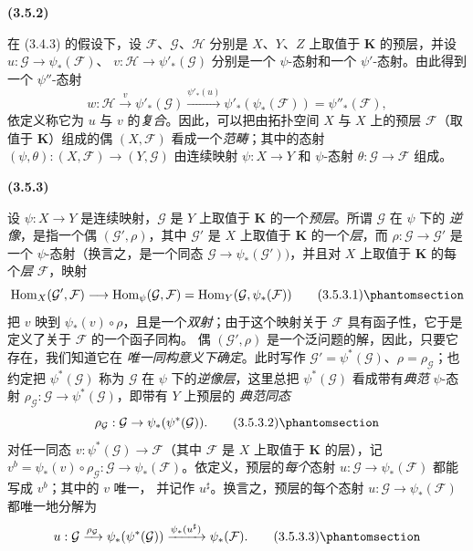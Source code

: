 \documentclass[UTF8,fontset=none,11pt,oneside,openany]{ctexbook}
\newenvironment{env}[1][]{%
  \par\medskip\noindent\textbf{(#1)}\ %
}{\par}
\let\EGAOriginalLabel\label
\renewcommand{\label}[1]{\phantomsection\EGAOriginalLabel{#1}}
\begin{document}
\begin{env}[3.5.2]
\label{0.3.5.2-fr}
在 (3.4.3) 的假设下，设 $\mathcal{F}$、$\mathcal{G}$、$\mathcal{H}$
分别是 $X$、$Y$、$Z$ 上取值于 $\mathbf{K}$ 的预层，并设
$u:\mathcal{G}\to\psi_*(\mathcal{F})$、
$v:\mathcal{H}\to\psi'_*(\mathcal{G})$ 分别是一个 $\psi$-态射和一个
$\psi'$-态射。由此得到一个 $\psi''$-态射
\[
  w:\mathcal{H}\xrightarrow{v}\psi'_*(\mathcal{G})
  \xrightarrow{\psi'_*(u)}
  \psi'_*(\psi_*(\mathcal{F}))=\psi''_*(\mathcal{F}),
\]
依定义称它为 $u$ 与 $v$ 的\emph{复合}。因此，可以把由拓扑空间 $X$ 与
$X$ 上的预层 $\mathcal{F}$（取值于 $\mathbf{K}$）组成的偶
$(X,\mathcal{F})$ 看成一个\emph{范畴}；其中的态射
$(\psi,\theta):(X,\mathcal{F})\to(Y,\mathcal{G})$ 由连续映射
$\psi:X\to Y$ 和 $\psi$-态射 $\theta:\mathcal{G}\to\mathcal{F}$ 组成。
\end{env}

\begin{env}[3.5.3]
\label{0.3.5.3-fr}
设 $\psi:X\to Y$ 是连续映射，$\mathcal{G}$ 是 $Y$ 上取值于
$\mathbf{K}$ 的一个\emph{预层}。所谓 $\mathcal{G}$ 在 $\psi$ 下的
\emph{逆像}，是指一个偶 $(\mathcal{G}',\rho)$，其中 $\mathcal{G}'$ 是
$X$ 上取值于 $\mathbf{K}$ 的一个\emph{层}，而
$\rho:\mathcal{G}\to\mathcal{G}'$ 是一个 $\psi$-态射（换言之，是一个同态
$\mathcal{G}\to\psi_*(\mathcal{G}'))$，并且对 $X$ 上取值于
$\mathbf{K}$ 的每个\emph{层} $\mathcal{F}$，映射
\begin{equation*}
  \operatorname{Hom}_X(\mathcal{G}',\mathcal{F})
  \longrightarrow \operatorname{Hom}_\psi(\mathcal{G},\mathcal{F})
  =\operatorname{Hom}_Y(\mathcal{G},\psi_*(\mathcal{F}))
\tag{3.5.3.1}\label{0.3.5.3.1-fr}
\end{equation*}
把 $v$ 映到 $\psi_*(v)\circ\rho$，且是一个\emph{双射}；由于这个映射关于
$\mathcal{F}$ 具有函子性，它于是定义了关于 $\mathcal{F}$ 的一个函子同构。
偶 $(\mathcal{G}',\rho)$ 是一个泛问题的解，因此，只要它存在，我们知道它在
\emph{唯一同构意义下确定}。此时写作
$\mathcal{G}'=\psi^*(\mathcal{G})$、$\rho=\rho_{\mathcal{G}}$；也约定把
$\psi^*(\mathcal{G})$ 称为 $\mathcal{G}$ 在 $\psi$ 下的\emph{逆像层}，这里总把
$\psi^*(\mathcal{G})$ 看成带有\emph{典范} $\psi$-态射
$\rho_{\mathcal{G}}:\mathcal{G}\to\psi^*(\mathcal{G})$，即带有 $Y$ 上预层的
\emph{典范同态}
\begin{equation*}
  \rho_{\mathcal{G}}:\mathcal{G}\to\psi_*(\psi^*(\mathcal{G})).
\tag{3.5.3.2}\label{0.3.5.3.2-fr}
\end{equation*}
对任一同态 $v:\psi^*(\mathcal{G})\to\mathcal{F}$（其中
$\mathcal{F}$ 是 $X$ 上取值于 $\mathbf{K}$ 的层），记
$v^b=\psi_*(v)\circ\rho_{\mathcal{G}}:
\mathcal{G}\to\psi_*(\mathcal{F})$。依定义，预层的\emph{每个}态射
$u:\mathcal{G}\to\psi_*(\mathcal{F})$ 都能写成 $v^b$；其中的 $v$ 唯一，
并记作 $u^\sharp$。换言之，预层的每个态射
$u:\mathcal{G}\to\psi_*(\mathcal{F})$ 都唯一地分解为
\begin{equation*}
  u:\mathcal{G}\xrightarrow{\rho_{\mathcal{G}}}
  \psi_*(\psi^*(\mathcal{G}))
  \xrightarrow{\psi_*(u^\sharp)}\psi_*(\mathcal{F}).
\tag{3.5.3.3}\label{0.3.5.3.3-fr}
\end{equation*}
\end{env}
\end{document}
